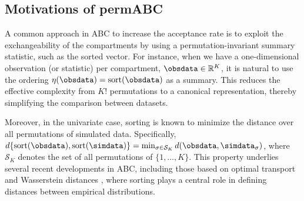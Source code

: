 \subsection{Motivations of permABC}

A common approach in ABC to increase the acceptance rate is to exploit the exchangeability of the compartments by using a permutation-invariant summary statistic, such as the sorted vector. For instance, when we have a one-dimensional observation (or statistic) per compartment, $\obsdata \in \mathbb{R}^K$, it is natural to use the ordering $\eta(\obsdata) = \text{sort}(\obsdata)$ as a summary. This reduces the effective complexity from $K!$ permutations to a canonical representation, thereby simplifying the comparison between datasets.

Moreover, in the univariate case, sorting is known to minimize the distance over all permutations of simulated data. Specifically, $d\{\text{sort}(\obsdata), \text{sort}(\simdata)\} = \min_{\sigma \in \mathcal{S}_K} d(\obsdata, \simdata_{\sigma})$, where $\mathcal{S}_K$ denotes the set of all permutations of $\{1,\dots,K\}$. This property underlies several recent developments in ABC, including those based on optimal transport and Wasserstein distances \citep{bernton2019approximate}, where sorting plays a central role in defining distances between empirical distributions.

